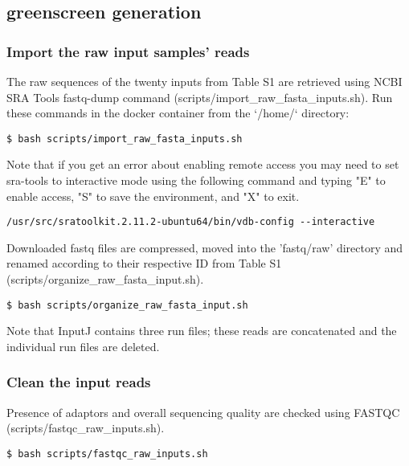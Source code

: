 \documentclass{article}
\begin{document}
\begin{sloppypar}
\subsection{greenscreen generation}
\subsubsection{Import the raw input samples' reads}

The raw sequences of the twenty inputs from Table S1 are retrieved using NCBI SRA Tools fastq-dump command ({\selectfont scripts/import\_raw\_fasta\_inputs.sh}). Run these commands in the docker container from the `/home/` directory:

\begin{verbatim}
$ bash scripts/import_raw_fasta_inputs.sh
\end{verbatim}

Note that if you get an error about enabling remote access you may need to set sra-tools to interactive mode using the following command and typing "E" to enable access, "S" to save the environment, and "X" to exit. 

\begin{verbatim}
/usr/src/sratoolkit.2.11.2-ubuntu64/bin/vdb-config --interactive
\end{verbatim}

Downloaded fastq files are compressed, moved into the 'fastq/raw' directory and renamed according to their respective ID from Table S1 ({\selectfont scripts/organize\_raw\_fasta\_input.sh}).

\begin{verbatim}
$ bash scripts/organize_raw_fasta_input.sh
\end{verbatim}

Note that InputJ contains three run files; these reads are concatenated and the individual run files are deleted.

\subsubsection{Clean the input reads}

Presence of adaptors and overall sequencing quality are checked using FASTQC ({\selectfont scripts/fastqc\_raw\_inputs.sh}). 

\begin{verbatim}
$ bash scripts/fastqc_raw_inputs.sh
\end{verbatim}


\end{sloppypar}
\end{document}
